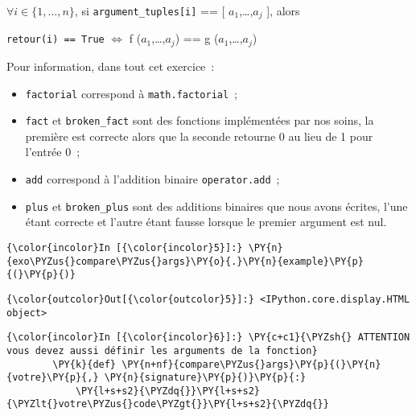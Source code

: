 \(\forall i \in \{1,...,n\}\), si \texttt{argument\_tuples{[}i{]}} ==
{[} \(a_1\),\ldots{},\(a_j\) {]}, alors

\texttt{retour(i)\ ==\ True} \(\Longleftrightarrow\) f
(\(a_1\),\ldots{},\(a_j\)) == g (\(a_1\),\ldots{},\(a_j\))

    Pour information, dans tout cet exercice~:

\begin{itemize}
\tightlist
\item
  \texttt{factorial} correspond à \texttt{math.factorial}~;
\item
  \texttt{fact} et \texttt{broken\_fact} sont des fonctions implémentées
  par nos soins, la première est correcte alors que la seconde retourne
  0 au lieu de 1 pour l'entrée 0~;
\item
  \texttt{add} correspond à l'addition binaire \texttt{operator.add}~;
\item
  \texttt{plus} et \texttt{broken\_plus} sont des additions binaires que
  nous avons écrites, l'une étant correcte et l'autre étant fausse
  lorsque le premier argument est nul.
\end{itemize}

    \begin{Verbatim}[commandchars=\\\{\},frame=single,framerule=0.3mm,rulecolor=\color{cellframecolor}]
{\color{incolor}In [{\color{incolor}5}]:} \PY{n}{exo\PYZus{}compare\PYZus{}args}\PY{o}{.}\PY{n}{example}\PY{p}{(}\PY{p}{)}
\end{Verbatim}


\begin{Verbatim}[commandchars=\\\{\},frame=single,framerule=0.3mm,rulecolor=\color{cellframecolor}]
{\color{outcolor}Out[{\color{outcolor}5}]:} <IPython.core.display.HTML object>
\end{Verbatim}
            
    \begin{Verbatim}[commandchars=\\\{\},frame=single,framerule=0.3mm,rulecolor=\color{cellframecolor}]
{\color{incolor}In [{\color{incolor}6}]:} \PY{c+c1}{\PYZsh{} ATTENTION vous devez aussi définir les arguments de la fonction}
        \PY{k}{def} \PY{n+nf}{compare\PYZus{}args}\PY{p}{(}\PY{n}{votre}\PY{p}{,} \PY{n}{signature}\PY{p}{)}\PY{p}{:}
            \PY{l+s+s2}{\PYZdq{}}\PY{l+s+s2}{\PYZlt{}votre\PYZus{}code\PYZgt{}}\PY{l+s+s2}{\PYZdq{}}
\end{Verbatim}


